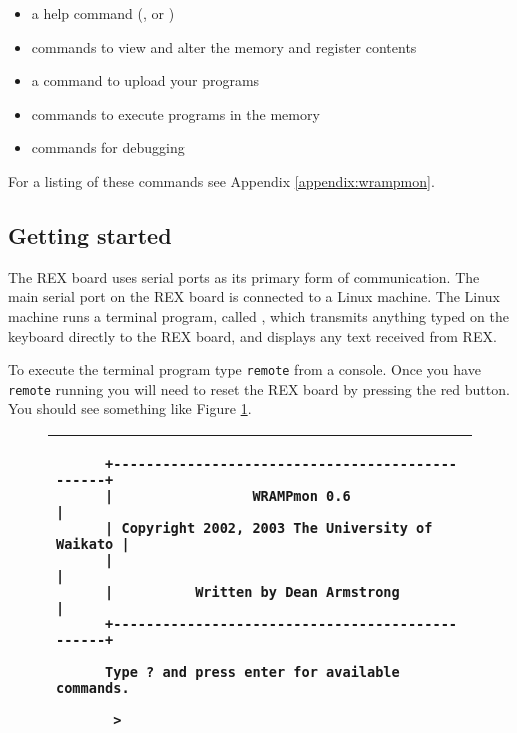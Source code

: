 \begin{itemize}
\item a help command (, or )
\item commands to view and alter the memory and register contents
\item a command to upload your programs
\item commands to execute programs in the memory
\item commands for debugging
\end{itemize}

For a listing of these commands see Appendix \ref{appendix:wrampmon}.

\subsection{Getting started}
The REX board uses serial ports as its primary form of communication.
The main serial port on the REX board is connected to a Linux
machine. The Linux machine runs a terminal program, called
, which transmits anything typed on the keyboard
directly to the REX board, and displays any text received from REX.

To execute the terminal program type \verb|remote| from a console.
Once you have \verb|remote| running you will need to reset the REX
board by pressing the red  button.  You should see
something like Figure \ref{wrampmon}.

\begin{figure}[hbp]
\begin{center}
\begin{tabular}{|p{15cm}|}
\hline
\begin{verbatim}
      +------------------------------------------------+
      |                 WRAMPmon 0.6                   |
      | Copyright 2002, 2003 The University of Waikato |
      |                                                |
      |          Written by Dean Armstrong             |
      +------------------------------------------------+
      
      Type ? and press enter for available commands.
      
       > 
\end{verbatim}
\\
\hline
\end{tabular}
\end{center}

\caption{\WRAMPmon}
\label{wrampmon}
\end{figure}

